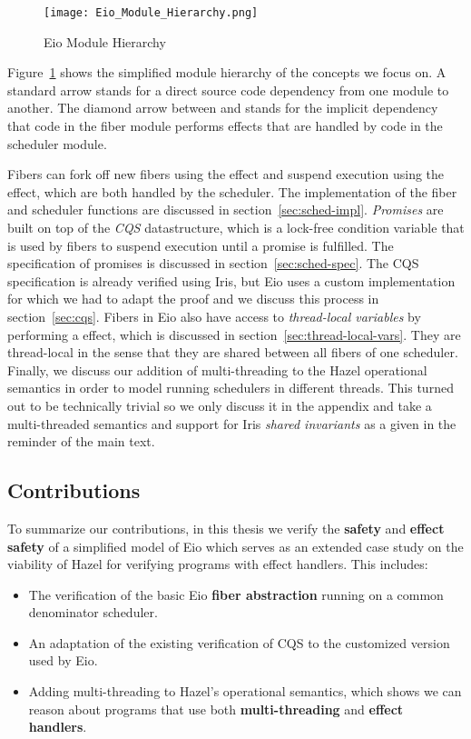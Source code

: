 \begin{figure}[ht]
    \centering
    \texttt{[image: Eio\_Module\_Hierarchy.png]}
    \caption{Eio Module Hierarchy}
    \label{fig:eio-module-hierarchy}
\end{figure}

Figure~\ref{fig:eio-module-hierarchy} shows the simplified module hierarchy of the concepts we focus on.
A standard arrow stands for a direct source code dependency from one module to another.
The diamond arrow between  and  stands for the implicit dependency that code in the fiber module performs effects that are handled by code in the scheduler module.

Fibers can fork off new fibers using the \efork{} effect and suspend execution using the \esuspend{} effect, which are both handled by the scheduler.
The implementation of the fiber and scheduler functions are discussed in section~\ref{sec:sched-impl}.
\textit{Promises} are built on top of the \textit{CQS} datastructure, which is a lock-free condition variable that is used by fibers to suspend execution until a promise is fulfilled.
The specification of promises is discussed in section~\ref{sec:sched-spec}.
The CQS specification is already verified using Iris, but Eio uses a custom implementation for which we had to adapt the proof and we discuss this process in section~\ref{sec:cqs}.
Fibers in Eio also have access to \textit{thread-local variables} by performing a \egetctx{} effect, which is discussed in section~\ref{sec:thread-local-vars}.
They are thread-local in the sense that they are shared between all fibers of one scheduler.
Finally, we discuss our addition of multi-threading to the Hazel operational semantics in order to model running schedulers in different threads.
This turned out to be technically trivial so we only discuss it in the appendix and take a multi-threaded semantics and support for Iris \textit{shared invariants} as a given in the reminder of the main text.

\subsection{Contributions}
\label{sec:intro-contributions}

To summarize our contributions, in this thesis we verify the \textbf{safety} and \textbf{effect safety} of a simplified model of Eio which serves as an extended case study on the viability of Hazel for verifying programs with effect handlers.
This includes:

\begin{itemize}
    \item The verification of the basic Eio \textbf{fiber abstraction} running on a common denominator scheduler.
    \item An adaptation of the existing verification of CQS to the customized version used by Eio.
    \item Adding multi-threading to Hazel's operational semantics, which shows we can reason about programs that use both \textbf{multi-threading} and \textbf{effect handlers}.
\end{itemize}
